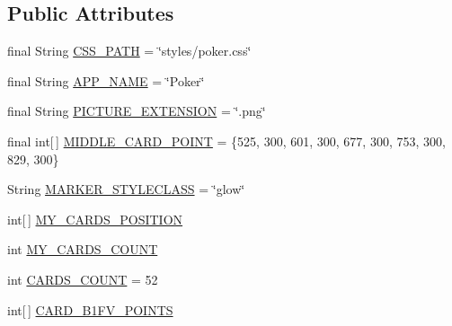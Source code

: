 \subsection*{Public Attributes}
\begin{DoxyCompactItemize}
\item 
final String \hyperlink{classhu_1_1elte_1_1bfw1p6_1_1poker_1_1client_1_1defaultvalues_1_1_abstract_default_values_a012a84f8508fc4cd0ddbaa03a18b7322}{C\+S\+S\+\_\+\+P\+A\+T\+H} = \char`\"{}styles/poker.\+css\char`\"{}
\item 
final String \hyperlink{classhu_1_1elte_1_1bfw1p6_1_1poker_1_1client_1_1defaultvalues_1_1_abstract_default_values_a082ad6053582f382981acad2c89c31e3}{A\+P\+P\+\_\+\+N\+A\+M\+E} = \char`\"{}Poker\char`\"{}
\item 
final String \hyperlink{classhu_1_1elte_1_1bfw1p6_1_1poker_1_1client_1_1defaultvalues_1_1_abstract_default_values_a75d308b91e3807b732c8639f61ef1adf}{P\+I\+C\+T\+U\+R\+E\+\_\+\+E\+X\+T\+E\+N\+S\+I\+O\+N} = \char`\"{}.png\char`\"{}
\item 
final int\mbox{[}$\,$\mbox{]} \hyperlink{classhu_1_1elte_1_1bfw1p6_1_1poker_1_1client_1_1defaultvalues_1_1_abstract_default_values_a5ce7c0550383fec467f7195b8d850bef}{M\+I\+D\+D\+L\+E\+\_\+\+C\+A\+R\+D\+\_\+\+P\+O\+I\+N\+T} = \{525, 300, 601, 300, 677, 300, 753, 300, 829, 300\}
\item 
String \hyperlink{classhu_1_1elte_1_1bfw1p6_1_1poker_1_1client_1_1defaultvalues_1_1_abstract_default_values_ab68d14abafb759acf2b1196280fff384}{M\+A\+R\+K\+E\+R\+\_\+\+S\+T\+Y\+L\+E\+C\+L\+A\+S\+S} = \char`\"{}glow\char`\"{}
\item 
int\mbox{[}$\,$\mbox{]} \hyperlink{classhu_1_1elte_1_1bfw1p6_1_1poker_1_1client_1_1defaultvalues_1_1_abstract_default_values_aac995029b5e9548dc81f4e7db5a8e81a}{M\+Y\+\_\+\+C\+A\+R\+D\+S\+\_\+\+P\+O\+S\+I\+T\+I\+O\+N}
\item 
int \hyperlink{classhu_1_1elte_1_1bfw1p6_1_1poker_1_1client_1_1defaultvalues_1_1_abstract_default_values_a8ec13c2b0faba053b878f25742781e25}{M\+Y\+\_\+\+C\+A\+R\+D\+S\+\_\+\+C\+O\+U\+N\+T}
\item 
int \hyperlink{classhu_1_1elte_1_1bfw1p6_1_1poker_1_1client_1_1defaultvalues_1_1_abstract_default_values_a28328b781302252576e5aaf03cc72a6b}{C\+A\+R\+D\+S\+\_\+\+C\+O\+U\+N\+T} = 52
\item 
int\mbox{[}$\,$\mbox{]} \hyperlink{classhu_1_1elte_1_1bfw1p6_1_1poker_1_1client_1_1defaultvalues_1_1_abstract_default_values_ac6bb91cea99896ac92f6e2d73416ad1e}{C\+A\+R\+D\+\_\+\+B1\+F\+V\+\_\+\+P\+O\+I\+N\+T\+S}

\end{DoxyCompactItemize}
